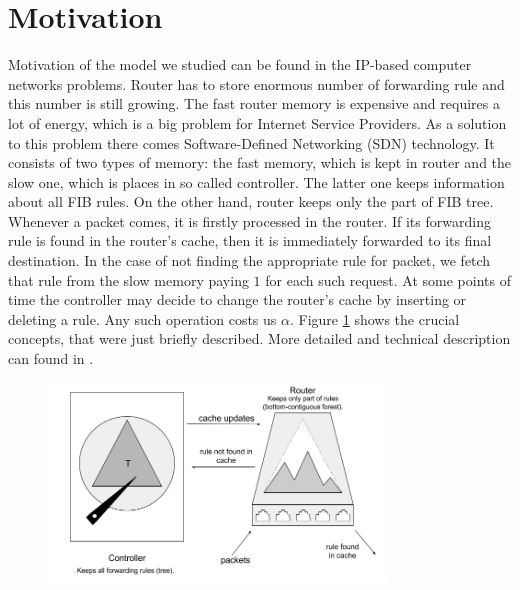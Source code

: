 \section{Motivation}
Motivation of the model we studied can be found in the IP-based computer networks 
problems. Router has to store enormous number of forwarding rule and this number is 
still growing. The fast router memory is expensive and requires a lot of energy, 
which is a big problem for Internet Service Providers. As a solution to this 
problem there comes Software-Defined Networking (SDN) technology. It consists of two 
types of memory: the fast memory, which is kept in router and the slow one, which is 
places in so called controller. The latter one keeps information about all FIB rules. On the other hand, 
router keeps only the part of FIB tree. Whenever a packet comes, it is firstly 
processed in the router. If its forwarding rule is found in the router's cache, then it 
is immediately forwarded to its final destination. In the case of not finding the appropriate
rule for packet, we fetch that rule from the slow memory paying $1$ for each such request. At some points of 
time the controller may decide to change the router's cache by inserting or deleting 
a rule. Any such operation costs us $\alpha$. Figure \ref{fig:motivation} shows 
the crucial concepts, that were just briefly described. More detailed and 
technical description can found in \cite{sdn}.
 \begin{figure}
 \begin{center}
  \includegraphics[width=0.8\textwidth]{motivation.png}
\end{center}
\caption{}
\label{fig:motivation}
\end{figure}

